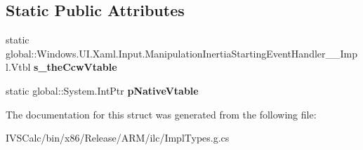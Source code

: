 \subsection*{Static Public Attributes}
\begin{DoxyCompactItemize}
\item 
\mbox{\label{struct_windows_1_1_u_i_1_1_xaml_1_1_input_1_1_manipulation_inertia_starting_event_handler_____impl_1_1_vtbl_ab8ae2aa73bd7f7cc0eb033255f7da0dc}} 
static global\+::\+Windows.\+U\+I.\+Xaml.\+Input.\+Manipulation\+Inertia\+Starting\+Event\+Handler\+\_\+\+\_\+\+Impl.\+Vtbl {\bfseries s\+\_\+the\+Ccw\+Vtable}
\item 
\mbox{\label{struct_windows_1_1_u_i_1_1_xaml_1_1_input_1_1_manipulation_inertia_starting_event_handler_____impl_1_1_vtbl_ab109e349145790781e947f36927a367d}} 
static global\+::\+System.\+Int\+Ptr {\bfseries p\+Native\+Vtable}
\end{DoxyCompactItemize}


The documentation for this struct was generated from the following file\+:\begin{DoxyCompactItemize}
\item 
I\+V\+S\+Calc/bin/x86/\+Release/\+A\+R\+M/ilc/Impl\+Types.\+g.\+cs\end{DoxyCompactItemize}
